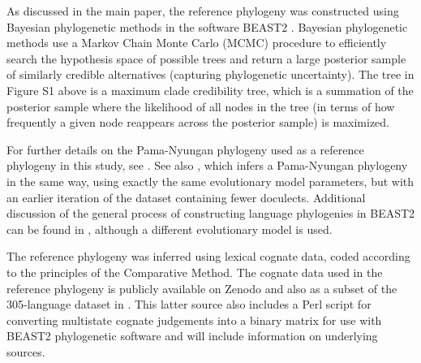 As discussed in the main paper, the reference phylogeny was constructed
using Bayesian phylogenetic methods in the software BEAST2
\autocite{bouckaert_beast_2014}. Bayesian phylogenetic methods use a
Markov Chain Monte Carlo (MCMC) procedure to efficiently search the
hypothesis space of possible trees and return a large posterior sample
of similarly credible alternatives (capturing phylogenetic uncertainty).
The tree in Figure S1 above is a maximum clade credibility tree, which
is a summation of the posterior sample where the likelihood of all nodes
in the tree (in terms of how frequently a given node reappears across
the posterior sample) is maximized.

For further details on the Pama-Nyungan phylogeny used as a reference
phylogeny in this study, see \textcite{bowern_pama-nyungan_2015}. See
also \textcite{bowern_computational_2012}, which infers a Pama-Nyungan
phylogeny in the same way, using exactly the same evolutionary model
parameters, but with an earlier iteration of the dataset containing
fewer doculects. Additional discussion of the general process of
constructing language phylogenies in BEAST2 can be found in
\textcite{bouckaert_origin_2018}, although a different evolutionary
model is used.

The reference phylogeny was inferred using lexical cognate data, coded
according to the principles of the Comparative Method. The cognate data
used in the reference phylogeny is publicly available on Zenodo
\autocite{bowern_pama-nyungan_2018} and also as a subset of the
305-language dataset in \textcite{bouckaert_origin_2018}. This latter
source also includes a Perl script for converting multistate cognate
judgements into a binary matrix for use with BEAST2 phylogenetic
software and will include information on underlying sources.
